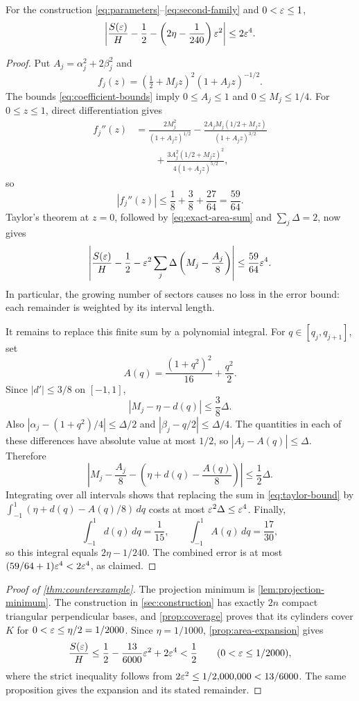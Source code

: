 \begin{proposition}\label{prop:area-expansion}
For the construction \eqref{eq:parameters}--\eqref{eq:second-family} and
$0<\varepsilon\le1$,
\[
 \left|\frac{S(\varepsilon)}H-\frac12-
       \left(2\eta-\frac1{240}\right)\varepsilon^2\right|
 \le 2\varepsilon^4.
\]
\end{proposition}
\begin{proof}
Put $A_j=\alpha_j^2+2\beta_j^2$ and
\[
 f_j(z)=(\tfrac12+M_jz)^2(1+A_jz)^{-1/2}.
\]
The bounds \eqref{eq:coefficient-bounds} imply $0\le A_j\le1$ and
$0\le M_j\le1/4$. For $0\le z\le1$, direct differentiation gives
\begin{align*}
 f_j''(z)&=\frac{2M_j^2}{(1+A_jz)^{1/2}}
 -\frac{2A_jM_j(1/2+M_jz)}{(1+A_jz)^{3/2}}\\
 &\qquad+\frac{3A_j^2(1/2+M_jz)^2}{4(1+A_jz)^{5/2}},
\end{align*}
so
\[
 |f_j''(z)|\le\frac18+\frac38+\frac{27}{64}=\frac{59}{64}.
\]
Taylor's theorem at $z=0$, followed by \eqref{eq:exact-area-sum} and
$\sum_j\Delta=2$, now gives
\begin{equation}\label{eq:taylor-bound}
 \left|\frac{S(\varepsilon)}H-\frac12-
 \varepsilon^2\sum_j\Delta\left(M_j-\frac{A_j}{8}\right)\right|
 \le\frac{59}{64}\varepsilon^4.
\end{equation}
In particular, the growing number of sectors causes no loss in the error
bound: each remainder is weighted by its interval length.

It remains to replace this finite sum by a polynomial integral. For
$q\in[q_j,q_{j+1}]$, set
\[
 A(q)=\frac{(1+q^2)^2}{16}+\frac{q^2}{2}.
\]
Since $|d'|\le3/8$ on $[-1,1]$,
\[
 |M_j-\eta-d(q)|\le\frac38\Delta.
\]
Also
$|\alpha_j-(1+q^2)/4|\le\Delta/2$ and
$|\beta_j-q/2|\le\Delta/4$.
The quantities in each of these differences have absolute value at most
$1/2$, so $|A_j-A(q)|\le\Delta$. Therefore
\[
 \left|M_j-\frac{A_j}{8}
     -\left(\eta+d(q)-\frac{A(q)}8\right)\right|
 \le\frac12\Delta.
\]
Integrating over all intervals shows that replacing the sum in
\eqref{eq:taylor-bound} by
$\int_{-1}^1(\eta+d(q)-A(q)/8)\,dq$ costs at most
$\varepsilon^2\Delta\le\varepsilon^4$. Finally,
\[
 \int_{-1}^1d(q)\,dq=\frac1{15},\qquad
 \int_{-1}^1A(q)\,dq=\frac{17}{30},
\]
so this integral equals $2\eta-1/240$. The combined error is at most
$(59/64+1)\varepsilon^4<2\varepsilon^4$, as claimed.
\end{proof}

\begin{proof}[Proof of \cref{thm:counterexample}]
The projection minimum is \cref{lem:projection-minimum}.
The construction in \cref{sec:construction} has exactly $2n$ compact
triangular perpendicular bases, and \cref{prop:coverage} proves that its
cylinders cover $K$ for $0<\varepsilon\le\eta/2=1/2000$.
Since $\eta=1/1000$, \cref{prop:area-expansion} gives
\[
 \frac{S(\varepsilon)}H
 \le\frac12-\frac{13}{6000}\varepsilon^2+2\varepsilon^4<\frac12
 \qquad(0<\varepsilon\le1/2000),
\]
where the strict inequality follows from
$2\varepsilon^2\le1/2{,}000{,}000<13/6000$.
The same proposition gives the expansion and its stated remainder.
\end{proof}

